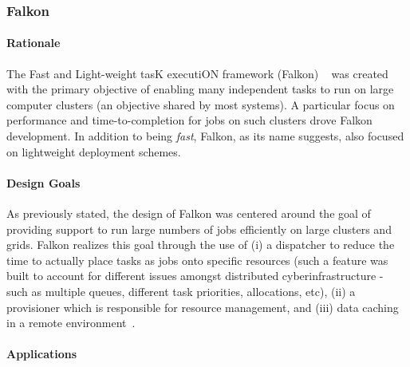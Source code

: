 \documentclass{sig-alternate}
\begin{document}
\subsubsection{Falkon}


\paragraph{Rationale}
The Fast and Light-weight tasK executiON framework (Falkon)
~\cite{1362680} was created with the primary objective
of enabling many independent tasks to run on large computer
clusters (an objective shared by most \pilotjob systems).
A particular focus on performance and time-to-completion for jobs
on such clusters drove Falkon development. In
addition to being \textit{fast}, Falkon, as its name suggests,
also focused on lightweight deployment schemes.

\paragraph{Design Goals}
As previously stated, the design of Falkon was centered
around the goal of providing support to run large numbers
of jobs efficiently on large clusters and grids. Falkon
realizes this goal through the use of (i) a
dispatcher to reduce the time to actually place
tasks as jobs onto specific resources (such a feature
was built to account for different issues amongst
distributed cyberinfrastructure - such as multiple
queues, different task priorities, allocations, etc),
(ii) a provisioner which is responsible for
resource management, and (iii) data caching in
a remote environment~\cite{1362680}.


\paragraph{Applications}
\end{document}
